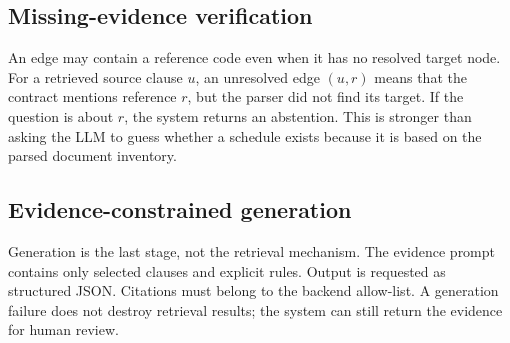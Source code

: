 \documentclass[11pt,letterpaper]{article}
\begin{document}
\subsection{Missing-evidence verification}
An edge may contain a reference code even when it has no resolved target node. For a retrieved source clause $u$, an unresolved edge $(u,r)$ means that the contract mentions reference $r$, but the parser did not find its target. If the question is about $r$, the system returns an abstention. This is stronger than asking the LLM to guess whether a schedule exists because it is based on the parsed document inventory.

\subsection{Evidence-constrained generation}
Generation is the last stage, not the retrieval mechanism. The evidence prompt contains only selected clauses and explicit rules. Output is requested as structured JSON. Citations must belong to the backend allow-list. A generation failure does not destroy retrieval results; the system can still return the evidence for human review.
\end{document}
